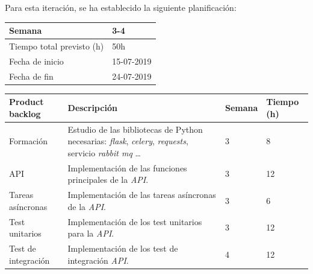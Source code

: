 Para esta iteración, se ha establecido la siguiente planificación:

\begin{table}[h!]
\centering
\begin{tabular}{|p{5cm}|p{4cm}|}
 \hline
	\cellcolor[gray]{0.9} Semana  & 3-4 \\ \hline
	\cellcolor[gray]{0.9} Tiempo total previsto (h)  & 50h \\ \hline
	\cellcolor[gray]{0.9} Fecha de inicio  & 15-07-2019 \\ \hline
	\cellcolor[gray]{0.9} Fecha de fin  & 24-07-2019 \\ \hline
		
\end{tabular}
\end{table}

\begin{table}[h!]
\begin{tabular}{|p{4cm}|p{7.2cm}|p{1.3cm}|p{2.1cm}|}
\hline
\rowcolor[HTML]{9B9B9B} 
{\color[HTML]{FFFFFF} Product backlog} & {\color[HTML]{FFFFFF} Descripción}                                  & {\color[HTML]{FFFFFF} Semana} & {\color[HTML]{FFFFFF}Tiempo (h)} \\ \hline
Formación                             & Estudio de las bibliotecas de Python necesarias: \textit{flask}, \textit{celery}, \textit{requests}, servicio \textit{rabbit mq} \ldots
                                        & 3                             & 8                                   \\ \hline
API                        & Implementación de las funciones principales de la \textit{API}.
                                  & 3                             & 12                                  \\ \hline
Tareas asíncronas                         & Implementación de las tareas asíncronas de la \textit{API}.
          & 3                             & 6                                   \\ \hline
Test unitarios                         & Implementación de los test unitarios para la \textit{API}.
          & 3                             & 12                                   \\ \hline

Test de integración                         & Implementación de los test de integración \textit{API}. & 4 & 12 \\ \hline  

\end{tabular}
\end{table}

